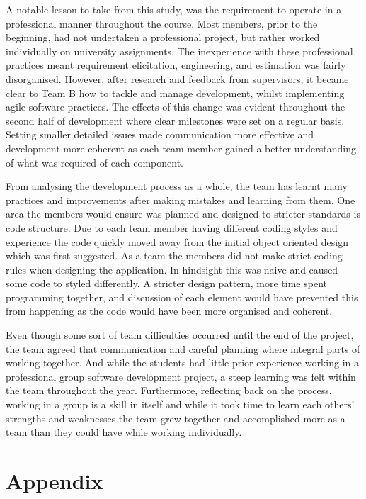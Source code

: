 \documentclass{l3proj}
\begin{document}
A notable lesson to take from this study, was the requirement to operate in a  professional manner throughout the course. Most members, prior to the beginning, had not undertaken a professional project, but rather worked individually on university assignments. The inexperience with these professional practices meant requirement elicitation, engineering, and estimation was fairly disorganised. However, after research and feedback from supervisors, it became clear to Team B how to tackle and manage development, whilst implementing agile software practices. The effects of this change was evident throughout the second half of development where clear milestones were set on a regular basis. Setting smaller detailed issues made communication more effective and development more coherent as each team member gained a better understanding of what was required of each component.

From analysing the development process as a whole, the team has learnt many practices and improvements after making mistakes and learning from them. One area the members would ensure was planned and designed to stricter standards is code structure. Due to each team member having different coding styles and experience the code quickly moved away from the initial object oriented design which was first suggested. As a team the members did not make strict coding rules when designing the application. In hindsight this was naive and caused some code to styled differently. A stricter design pattern, more time spent programming together, and discussion of each element would have prevented this from happening as the code would have been more organised and coherent.

Even though some sort of team difficulties occurred until the end of the project, the team agreed that communication and careful planning where integral parts of working together. And while the students had little prior experience working in a professional group software development project, a steep learning was felt within the team throughout the year. Furthermore, reflecting back on the process, working in a group is a skill in itself and while it took time to learn each others' strengths and weaknesses the team grew together and accomplished more as a team than they could have while working individually.
\pagebreak
\section{Appendix}
\label{sec:appendix}
\end{document}
